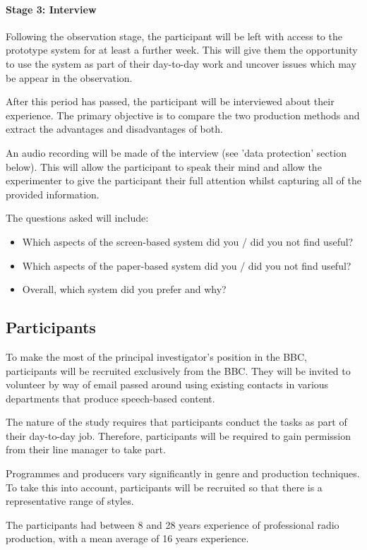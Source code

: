 \paragraph{Stage 3: Interview}
Following the observation stage, the participant will be left with access to the prototype system for at least a
further week. This will give them the opportunity to use the system as part of their day-to-day work and uncover issues
which may be appear in the observation.

After this period has passed, the participant will be interviewed about their experience. The primary objective is to
compare the two production methods and extract the advantages and disadvantages of both.

An audio recording will be made of the interview (see 'data protection' section below). This will allow the participant
to speak their mind and allow the experimenter to give the participant their full attention whilst capturing all of the
provided information.

The questions asked will include:
\begin{itemize}
\item Which aspects of the screen-based system did you / did you not find useful?
\item Which aspects of the paper-based system did you / did you not find useful?
\item Overall, which system did you prefer and why?
\end{itemize}


\subsection{Participants}
To make the most of the principal investigator's position in the BBC, participants will be recruited exclusively from
the BBC. They will be invited to volunteer by way of email passed around using existing contacts in various departments
that produce speech-based content. 

The nature of the study requires that participants conduct the tasks as part of their day-to-day job. Therefore,
participants will be required to gain permission from their line manager to take part.

Programmes and producers vary significantly in genre and production techniques.  To take this into account,
participants will be recruited so that there is a representative range of styles.

The participants had between 8 and 28 years experience of professional radio production, with a mean average of
16 years experience.


